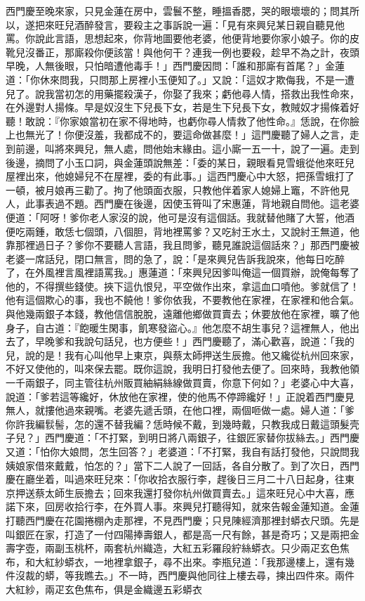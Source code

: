 \begin{showcontents}{}
西門慶至晚來家，只見金蓮在房中，雲鬟不整，睡搵香腮，哭的眼壞壞的；問其所以，遂把來旺兒酒醉發言，要殺主之事訴說一遍：「見有來興兒某日親自聽見他罵。你說此言語，思想起來，你背地圖要他老婆，他便背地要你家小娘子。你的皮靴兒沒番正，那廝殺你便該當！與他何干？連我一例也要殺，趁早不為之計，夜頭早晚，人無後眼，只怕暗遭他毒手！」西門慶因問：「誰和那廝有首尾？」金蓮道：「你休來問我，只問那上房裡小玉便知了。」又說：「這奴才欺侮我，不是一遭兒了。說我當初怎的用藥擺殺漢子，你娶了我來；虧他尋人情，搭救出我性命來，在外邊對人揚條。早是奴沒生下兒長下女，若是生下兒長下女，教賊奴才揚條着好聽！敢說：『你家娘當初在家不得地時，也虧你尋人情救了他性命。』恁說，在你臉上也無光了！你便沒羞，我都成不的，要這命做甚麼！」這門慶聽了婦人之言，走到前邊，叫將來興兒，無人處，問他始末緣由。這小廝一五一十，說了一遍。走到後邊，摘問了小玉口詞，與金蓮頭說無差：「委的某日，親眼看見雪蛾從他來旺兒屋裡出來，他媳婦兒不在屋裡，委的有此事。」這西門慶心中大怒，把孫雪蛾打了一頓，被月娘再三勸了。拘了他頭面衣服，只教他伴着家人媳婦上竈，不許他見人，此事表過不題。西門慶在後邊，因使玉筲叫了宋惠蓮，背地親自問他。這老婆便道：「阿呀！爹你老人家沒的說，他可是沒有這個話。我就替他賭了大誓，他酒便吃兩鍾，敢恁七個頭，八個胆，背地裡罵爹？又吃紂王水土，又說紂王無道，他靠那裡過日子？爹你不要聽人言語，我且問爹，聽見誰說這個話來？」那西門慶被老婆一席話兒，閉口無言，問的急了，說：「是來興兒告訴我說來，他每日吃醉了，在外風裡言風裡語罵我。」惠蓮道：「來興兒因爹叫俺這一個買辦，說俺每奪了他的，不得撰些錢使。挾下這仇恨兒，平空做作出來，拿這血口噴他。爹就信了！他有這個欺心的事，我也不饒他！爹你依我，不要教他在家裡，在家裡和他合氣。與他幾兩銀子本錢，教他信信脫脫，遠離他鄉做買賣去；休要放他在家裡，曠了他身子，自古道：『飽暖生閑事，飢寒發盜心。』他怎麼不胡生事兒？這裡無人，他出去了，早晚爹和我說句話兒，也方便些！」西門慶聽了，滿心歡喜，說道：「我的兒，說的是！我有心叫他早上東京，與蔡太師押送生辰擔。他又纔從杭州回來家，不好又使他的，叫來保去罷。既你這說，我明日打發他去便了。回來時，我教他領一千兩銀子，同主管往杭州販買紬絹絲線做買賣，你意下何如？」老婆心中大喜，說道：「爹若這等纔好，休放他在家裡，使的他馬不停蹄纔好！」正說着西門慶見無人，就摟他過來親嘴。老婆先遞舌頭，在他口裡，兩個咂做一處。婦人道：「爹你許我編䯼髻，怎的還不替我編？恁時候不戴，到幾時戴，只教我成日戴這頭髮壳子兒？」西門慶道：「不打緊，到明日將八兩銀子，往銀匠家替你拔絲去。」西門慶又道：「怕你大娘問，怎生回答？」老婆道：「不打緊，我自有話打發他，只說問我姨娘家借來戴戴，怕怎的？」當下二人說了一回話，各自分散了。到了次日，西門慶在廳坐着，叫過來旺兒來：「你收拾衣服行李，趕後日三月二十八日起身，往東京押送蔡太師生辰擔去；回來我還打發你杭州做買賣去。」這來旺兒心中大喜，應諾下來，回房收拾行李，在外買人事。來興兒打聽得知，就來告報金蓮知道。金蓮打聽西門慶在花園捲棚內走那裡，不見西門慶；只見陳經濟那裡封蟒衣尺頭。先是叫銀匠在家，打造了一付四陽捧壽銀人，都是高一尺有餘，甚是奇巧；又是兩把金壽字壺，兩副玉桃杯，兩套杭州織造，大紅五彩羅段紵絲蟒衣。只少兩疋玄色焦布，和大紅紗蟒衣，一地裡拿銀子，尋不出來。李瓶兒道：「我那邊樓上，還有幾件沒裁的蟒，等我瞧去。」不一時，西門慶與他同往上樓去尋，揀出四件來。兩件大紅紗，兩疋玄色焦布，俱是金織邊五彩蟒衣
\end{showcontents}
